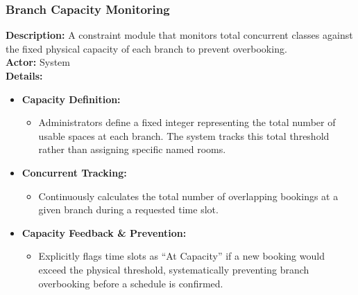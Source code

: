 \subsubsection{Branch Capacity Monitoring}
\textbf{Description:} A constraint module that monitors total concurrent classes against the fixed physical capacity of each branch to prevent overbooking. \\
\textbf{Actor:} System \\
\textbf{Details:}
\begin{itemize}
    \item \textbf{Capacity Definition:}
    \begin{itemize}
        \item Administrators define a fixed integer representing the total number of usable spaces at each branch. The system tracks this total threshold rather than assigning specific named rooms.
    \end{itemize}

    \item \textbf{Concurrent Tracking:}
    \begin{itemize}
        \item Continuously calculates the total number of overlapping bookings at a given branch during a requested time slot.
    \end{itemize}
    
    \item \textbf{Capacity Feedback \& Prevention:}
    \begin{itemize}
        \item Explicitly flags time slots as \enquote{At Capacity} if a new booking would exceed the physical threshold, systematically preventing branch overbooking before a schedule is confirmed.
    \end{itemize}
\end{itemize}


